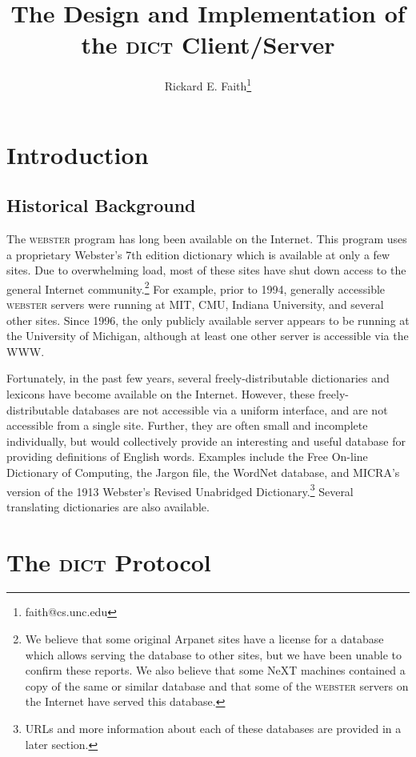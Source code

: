 \documentclass{article}
\newcommand{\dict}{\textsc{dict}\xspace}
\newcommand{\webster}{\textsc{webster}\xspace}
\begin{document}
\title{The Design and Implementation of the \dict Client/Server}
\author{Rickard E. Faith\thanks{faith@cs.unc.edu}}
\maketitle


\section{Introduction}


\subsection{Historical Background}

The \webster program has long been available on the Internet.  This program
uses a proprietary Webster's 7th edition dictionary which is available at
only a few sites.  Due to overwhelming load, most of these sites have shut
down access to the general Internet community.\footnote{We believe that
  some original Arpanet sites have a license for a database which allows
  serving the database to other sites, but we have been unable to confirm
  these reports.  We also believe that some NeXT machines contained a copy
  of the same or similar database and that some of the \webster servers on
  the Internet have served this database.} For example, prior to 1994,
generally accessible \webster servers were running at MIT, CMU, Indiana
University, and several other sites.  Since 1996, the only publicly
available server appears to be running at the University of Michigan,
although at least one other server is accessible via the WWW.

Fortunately, in the past few years, several freely-distributable
dictionaries and lexicons have become available on the Internet.  However,
these freely-distributable databases are not accessible via a uniform
interface, and are not accessible from a single site.  Further, they are
often small and incomplete individually, but would collectively provide an
interesting and useful database for providing definitions of English words.
Examples include the Free On-line Dictionary of Computing, the Jargon file,
the WordNet database, and MICRA's version of the 1913 Webster's Revised
Unabridged Dictionary.\footnote{URLs and more information about each of
  these databases are provided in a later section.} Several translating
dictionaries are also available.

\section{The \dict Protocol}
\end{document}
